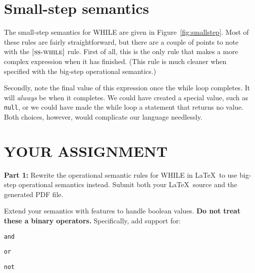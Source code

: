 \documentclass{article}
\newcommand{\rel}[1]{ \mbox{\sc [#1]} }
\begin{document}
\section{Small-step semantics}

\newcommand{\ssrule}[3]{
  \rel{#1} &
  \frac{\strut\begin{array}{@{}c@{}} #2 \end{array}}
       {\strut\begin{array}{@{}c@{}} #3 \end{array}}
   \\~\\
}
\newcommand{\sstep}[4]{{#1},{#2} \rightarrow {#3},{#4}}
\newcommand{\ctxt}{C}

The small-step semantics for WHILE are given in Figure~\ref{fig:smallstep}.
%
Most of these rules are fairly straightforward, but there are a couple of points
to note with the $\rel{ss-while}$ rule.
First of all, this is the only rule that makes a more complex expression
when it has finished.
(This rule is much cleaner when specified with the big-step operational semantics.)

Secondly, note the final value of this expression once the while loop completes.
It will \emph{always} be {\false} when it completes.
We could have created a special value, such as {\tt null},
or we could have made the while loop a statement that returns no value.
Both choices, however, would complicate our language needlessly.


\section{YOUR ASSIGNMENT}
\newcommand{\bstep}[4]{{#1},{#2} \Downarrow {#3},{#4}}

\noindent
{\bf Part 1:}
Rewrite the operational semantic rules for WHILE in \LaTeX\
to use big-step operational semantics instead.
Submit both your \LaTeX\ source and the generated PDF file.

Extend your semantics with features to handle boolean values.
{\bf Do not treat these a binary operators.}
Specifically, add support for:
\begin{compactitem}
  \item {\tt and}
  \item {\tt or}
  \item {\tt not}
\end{compactitem}
\end{document}
